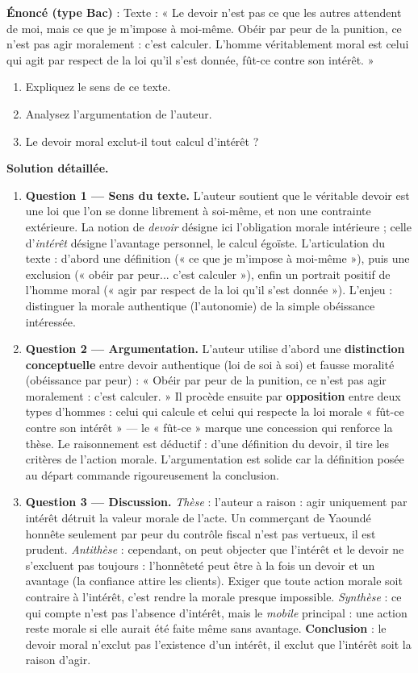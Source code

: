 \documentclass[11pt]{article}
\begin{document}
\begin{exoresolu}
\textbf{Énoncé (type Bac)} : Texte : « Le devoir n'est pas ce que les autres attendent de moi, mais ce que je m'impose à moi-même. Obéir par peur de la punition, ce n'est pas agir moralement : c'est calculer. L'homme véritablement moral est celui qui agit par respect de la loi qu'il s'est donnée, fût-ce contre son intérêt. »
\begin{enumerate}
\item Expliquez le sens de ce texte.
\item Analysez l'argumentation de l'auteur.
\item Le devoir moral exclut-il tout calcul d'intérêt ?
\end{enumerate}
\tcblower
\textbf{Solution détaillée.}
\begin{enumerate}
\item \textbf{Question 1 — Sens du texte.} L'auteur soutient que le véritable devoir est une loi que l'on se donne librement à soi-même, et non une contrainte extérieure. La notion de \emph{devoir} désigne ici l'obligation morale intérieure ; celle d'\emph{intérêt} désigne l'avantage personnel, le calcul égoïste. L'articulation du texte : d'abord une définition (« ce que je m'impose à moi-même »), puis une exclusion (« obéir par peur... c'est calculer »), enfin un portrait positif de l'homme moral (« agir par respect de la loi qu'il s'est donnée »). L'enjeu : distinguer la morale authentique (l'autonomie) de la simple obéissance intéressée.
\item \textbf{Question 2 — Argumentation.} L'auteur utilise d'abord une \textbf{distinction conceptuelle} entre devoir authentique (loi de soi à soi) et fausse moralité (obéissance par peur) : « Obéir par peur de la punition, ce n'est pas agir moralement : c'est calculer. » Il procède ensuite par \textbf{opposition} entre deux types d'hommes : celui qui calcule et celui qui respecte la loi morale « fût-ce contre son intérêt » — le « fût-ce » marque une concession qui renforce la thèse. Le raisonnement est déductif : d'une définition du devoir, il tire les critères de l'action morale. L'argumentation est solide car la définition posée au départ commande rigoureusement la conclusion.
\item \textbf{Question 3 — Discussion.} \emph{Thèse} : l'auteur a raison : agir uniquement par intérêt détruit la valeur morale de l'acte. Un commerçant de Yaoundé honnête seulement par peur du contrôle fiscal n'est pas vertueux, il est prudent. \emph{Antithèse} : cependant, on peut objecter que l'intérêt et le devoir ne s'excluent pas toujours : l'honnêteté peut être à la fois un devoir et un avantage (la confiance attire les clients). Exiger que toute action morale soit contraire à l'intérêt, c'est rendre la morale presque impossible. \emph{Synthèse} : ce qui compte n'est pas l'absence d'intérêt, mais le \emph{mobile} principal : une action reste morale si elle aurait été faite même sans avantage. \textbf{Conclusion} : le devoir moral n'exclut pas l'existence d'un intérêt, il exclut que l'intérêt soit la raison d'agir.
\end{enumerate}
\end{exoresolu}
\end{document}

